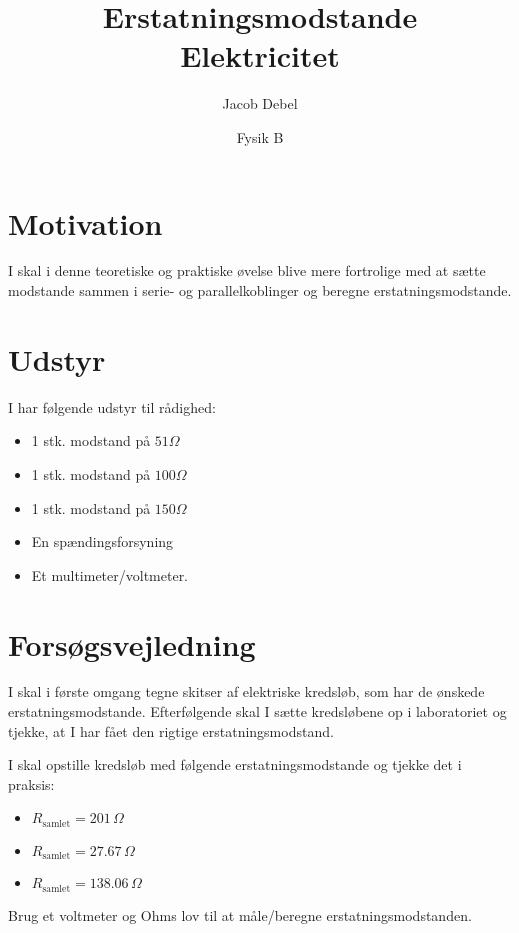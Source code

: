 \documentclass[a4paper, 12pt]{article}
\author{Jacob Debel}
\date{Fysik B}
\title{Erstatningsmodstande\\\medskip
\large Elektricitet}
\begin{document}
\maketitle

\section*{Motivation}
\label{sec:org9db078e}
I skal i denne teoretiske og praktiske øvelse blive mere fortrolige med at sætte modstande sammen i serie- og parallelkoblinger og beregne erstatningsmodstande.


\section*{Udstyr}
\label{sec:org49d5a07}
I har følgende udstyr til rådighed:
\begin{itemize}
\item 1 stk. modstand på \(51 \Omega\)
\item 1 stk. modstand på \(100 \Omega\)
\item 1 stk. modstand på \(150 \Omega\)
\item En spændingsforsyning
\item Et multimeter/voltmeter.
\end{itemize}


\section*{Forsøgsvejledning}
\label{sec:orge6f58bb}
I skal i første omgang tegne skitser af elektriske kredsløb, som har de ønskede erstatningsmodstande. Efterfølgende skal I sætte kredsløbene op i laboratoriet og tjekke, at I har fået den rigtige erstatningsmodstand.

I skal opstille kredsløb med følgende erstatningsmodstande og tjekke det i praksis:

\begin{itemize}
\item \(R_\text{samlet} = 201 \, \Omega\)
\item \(R_\text{samlet} = 27.67\, \Omega\)
\item \(R_\text{samlet} = 138.06 \, \Omega\)
\end{itemize}


Brug et voltmeter og Ohms lov til at måle/beregne erstatningsmodstanden.
\end{document}
